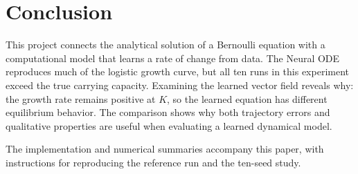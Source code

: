 \documentclass[11pt]{article}
\begin{document}
\section{Conclusion}

This project connects the analytical solution of a Bernoulli equation with a
computational model that learns a rate of change from data. The Neural ODE
reproduces much of the logistic growth curve, but all ten runs in this
experiment exceed the true carrying capacity. Examining the learned vector
field reveals why: the growth rate remains positive at $K$, so the learned
equation has different equilibrium behavior. The comparison shows why both
trajectory errors and qualitative properties are useful when evaluating a
learned dynamical model.

The implementation and numerical summaries accompany this paper, with
instructions for reproducing the reference run and the ten-seed study.



\end{document}
